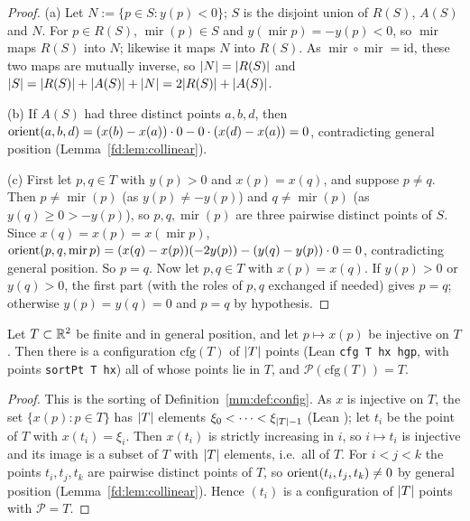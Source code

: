 \begin{proof}
(a) Let $N:=\{p\in S:y(p)<0\}$; $S$ is the disjoint union of $R(S)$, $A(S)$ and $N$. For $p\in R(S)$,
$\operatorname{mir}(p)\in S$ and $y(\operatorname{mir}p)=-y(p)<0$, so $\operatorname{mir}$ maps $R(S)$ into $N$; likewise
it maps $N$ into $R(S)$. As $\operatorname{mir}\circ\operatorname{mir}=\mathrm{id}$, these two maps are mutually inverse,
so $\lvert N\rvert=\lvert R(S)\rvert$ and $\lvert S\rvert=\lvert R(S)\rvert+\lvert A(S)\rvert+\lvert N\rvert=2\lvert R(S)\rvert+\lvert A(S)\rvert$.

(b) If $A(S)$ had three distinct points $a,b,d$, then $\operatorname{orient}(a,b,d)=(x(b)-x(a))\cdot0-0\cdot(x(d)-x(a))=0$, contradicting
general position (Lemma~\ref{fd:lem:collinear}).

(c) First let $p,q\in T$ with $y(p)>0$ and $x(p)=x(q)$, and suppose $p\ne q$. Then $p\ne\operatorname{mir}(p)$ (as
$y(p)\ne-y(p)$) and $q\ne\operatorname{mir}(p)$ (as $y(q)\ge0>-y(p)$), so $p,q,\operatorname{mir}(p)$ are three pairwise
distinct points of $S$. Since $x(q)=x(p)=x(\operatorname{mir}p)$,
$\operatorname{orient}(p,q,\operatorname{mir}p)=(x(q)-x(p))(-2y(p))-(y(q)-y(p))\cdot0=0$, contradicting general position. So $p=q$. Now
let $p,q\in T$ with $x(p)=x(q)$. If $y(p)>0$ or $y(q)>0$, the first part (with the roles of $p,q$ exchanged if needed)
gives $p=q$; otherwise $y(p)=y(q)=0$ and $p=q$ by hypothesis.
\end{proof}

\begin{lemma}\label{mb:lem:sort}
Let $T\subset\mathbb R^2$ be finite and in general position, and let $p\mapsto x(p)$ be injective on $T$. Then there is a
configuration $\mathrm{cfg}(T)$ of $\lvert T\rvert$ points (Lean \texttt{cfg T hx hgp}, with points \texttt{sortPt T hx}) all
of whose points lie in $T$, and $\mathcal P(\mathrm{cfg}(T))=T$.
\end{lemma}

\begin{proof}
This is the sorting of Definition~\ref{mm:def:config}. As $x$ is injective on $T$, the set $\{x(p):p\in T\}$ has $\lvert T\rvert$
elements $\xi_0<\dots<\xi_{\lvert T\rvert-1}$ (Lean ); let $t_i$ be the point of $T$ with
$x(t_i)=\xi_i$. Then $x(t_i)$ is strictly increasing in $i$, so $i\mapsto t_i$ is injective and its image is a subset of
$T$ with $\lvert T\rvert$ elements, i.e.\ all of $T$. For $i<j<k$ the points $t_i,t_j,t_k$ are pairwise distinct points of $T$,
so $\operatorname{orient}(t_i,t_j,t_k)\ne0$ by general position (Lemma~\ref{fd:lem:collinear}). Hence $(t_i)$ is a configuration of
$\lvert T\rvert$ points with $\mathcal P=T$.
\end{proof}

